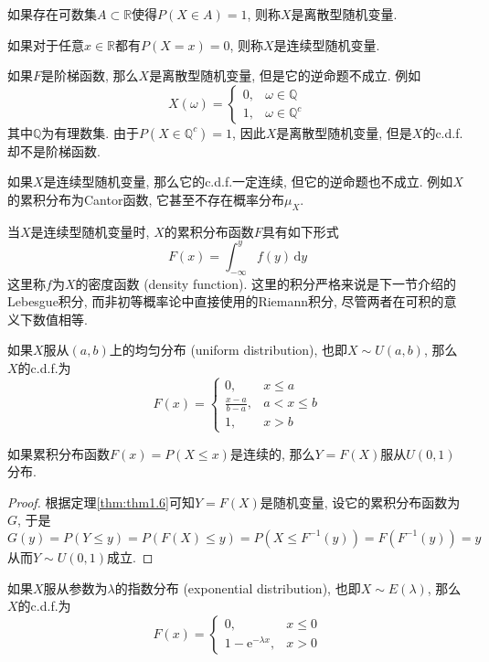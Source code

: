 \documentclass[cn, 12pt, math=mtpro2, bibstyle=apa, blue, twocol]{elegantbook}
\newcommand{\R}{\mathbb{R}}
\newcommand{\PP}{P}
\begin{document}
\begin{definition}
如果存在可数集$A\subset\R$使得$\PP(X\in A)=1$, 则称$X$是离散型随机变量.

如果对于任意$x\in\R$都有$\PP(X=x)=0$, 则称$X$是连续型随机变量.
\end{definition}
\begin{example}
如果$F$是阶梯函数, 那么$X$是离散型随机变量, 但是它的逆命题不成立. 例如
$$X(\omega)=\begin{cases}
              0, & \omega\in\mathbb{Q} \\
              1, & \omega\in\mathbb{Q}^c
            \end{cases}$$
其中$\mathbb{Q}$为有理数集. 由于$\PP(X\in\mathbb{Q}^c)=1$, 因此$X$是离散型随机变量, 但是$X$的c.d.f.却不是阶梯函数.
\end{example}
\begin{example}
如果$X$是连续型随机变量, 那么它的c.d.f.一定连续, 但它的逆命题也不成立. 例如$X$的累积分布为Cantor函数, 它甚至不存在概率分布$\mu_X$.
\end{example}
当$X$是连续型随机变量时, $X$的累积分布函数$F$具有如下形式
$$F(x)=\int_{-\infty}^{y}f(y)\,\text{d}y$$
这里称$f$为$X$的密度函数 (density function). 这里的积分严格来说是下一节介绍的Lebesgue积分, 而非初等概率论中直接使用的Riemann积分, 尽管两者在可积的意义下数值相等.
\begin{example}[均匀分布]
如果$X$服从$(a,b)$上的均匀分布 (uniform distribution), 也即$X\sim U(a,b)$, 那么$X$的c.d.f.为
$$F(x)=\begin{cases}
         0, & x\leq a \\
         \displaystyle\frac{x-a}{b-a}, & a<x\leq b \\
         1, & x>b
       \end{cases}$$
\end{example}
\begin{example}
如果累积分布函数$F(x)=P(X\leq x)$是连续的, 那么$Y=F(X)$服从$U(0,1)$分布.
\end{example}
\begin{proof}
  根据定理\ref{thm:thm1.6}可知$Y=F(X)$是随机变量, 设它的累积分布函数为$G$, 于是
  $$G(y)=P(Y\leq y)=P(F(X)\leq y)=P(X\leq F^{-1}(y))=F(F^{-1}(y))=y$$
  从而$Y\sim U(0,1)$成立.
\end{proof}

\begin{example}[指数分布]
如果$X$服从参数为$\lambda$的指数分布 (exponential distribution), 也即$X\sim E(\lambda)$, 那么$X$的c.d.f.为
$$F(x)=\begin{cases}
         0, & x\leq 0 \\
         1-\text{e}^{-\lambda x}, & x>0
       \end{cases}$$
\end{example}
\end{document}

